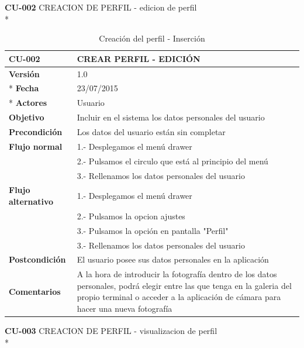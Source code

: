 \documentclass[../pfc.tex]{subfiles}
\begin{document}
	\textbf{CU-002}	CREACION DE PERFIL - edicion de perfil\\*
	
	\begin{table}[!hbt]
		\centering
		\begin{tabular}[t]{|p{3cm}|p{9.5cm}|}
			\hline \textbf{CU-002} & \textbf{CREAR PERFIL - EDICIÓN} \\*
			\hline\hline \textbf{Versión} & 1.0 \\ *
			\hline\hline \textbf{Fecha} & 23/07/2015 \\ *
			\hline\textbf{Actores} 	& Usuario\\*
			\hline \textbf{Objetivo} & Incluir en el sistema los datos personales del usuario\\* 			
			\hline \textbf{Precondición} & Los datos del usuario están sin completar \\* 
			\hline \textbf{Flujo normal} & 1.- Desplegamos el menú drawer \\* 
			& 2.- Pulsamos el circulo que está al principio del menú \\*	
			& 3.- Rellenamos los datos personales del usuario\\*	
			\hline \textbf{Flujo alternativo} & 1.- Desplegamos el menú drawer \\* 
			& 2.- Pulsamos la opcion ajustes \\*	
			& 3.- Pulsamos la opción en pantalla "Perfil" \\*	
			& 3.- Rellenamos los datos personales del usuario \\*	
			\hline \textbf{Postcondición} & El usuario posee sus datos personales en la aplicación \\* 
			\hline \textbf{Comentarios}   & A la hora de introducir la fotografía dentro de los datos personales, podrá elegir entre las que tenga en la galeria del propio terminal o acceder a la aplicación de cámara para hacer una nueva fotografía\\*
			\hline
		\end{tabular}
		\caption{Creación del perfil - Inserción}
		\label{tabla:caso002}
	\end{table}


		
	\textbf{CU-003}	CREACION DE PERFIL - visualizacion de perfil\\*
\end{document}
